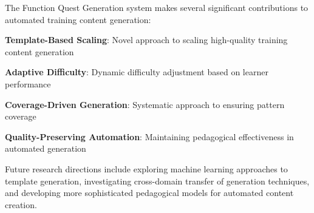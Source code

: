The Function Quest Generation system makes several significant contributions to automated training content generation:

\begin{compactlist}
    \item \textbf{Template-Based Scaling}: Novel approach to scaling high-quality training content generation
    \item \textbf{Adaptive Difficulty}: Dynamic difficulty adjustment based on learner performance
    \item \textbf{Coverage-Driven Generation}: Systematic approach to ensuring pattern coverage
    \item \textbf{Quality-Preserving Automation}: Maintaining pedagogical effectiveness in automated generation
\end{compactlist}

Future research directions include exploring machine learning approaches to template generation, investigating cross-domain transfer of generation techniques, and developing more sophisticated pedagogical models for automated content creation.

